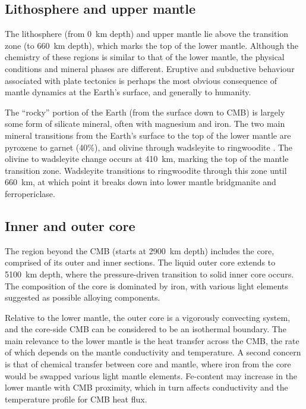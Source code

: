 \subsection{Lithosphere and upper mantle}

The lithosphere (from 0~km depth) and upper mantle lie above the transition zone (to 660~km depth), which marks the top of the lower mantle. Although the chemistry of these regions is similar to that of the lower mantle, the physical conditions and mineral phases are different. Eruptive and subductive behaviour associated with plate tectonics is perhaps the most obvious consequence of mantle dynamics at the Earth's surface, and generally to humanity.

The ``rocky'' portion of the Earth (from the surface down to CMB) is largely some form of silicate mineral, often with magnesium and iron. The two main mineral transitions from the Earth's surface to the top of the lower mantle are pyroxene to garnet (40\%), and olivine through wadsleyite to ringwoodite \citep[60\%][]{Tronnes2009}. The olivine to wadsleyite change occurs at 410~km, marking the top of the mantle transition zone. Wadsleyite transitions to ringwoodite through this zone until 660~km, at which point it breaks down into lower mantle bridgmanite and ferropericlase.

\subsection{Inner and outer core}

The region beyond the CMB (starts at 2900~km depth) includes the core, comprised of its outer and inner sections. The liquid outer core extends to 5100~km depth, where the pressure-driven transition to solid inner core occurs. The composition of the core is dominated by iron, with various light elements suggested as possible alloying components.

Relative to the lower mantle, the outer core is a vigorously convecting system, and the core-side CMB can be considered to be an isothermal boundary. The main relevance to the lower mantle is the heat transfer across the CMB, the rate of which depends on the mantle conductivity and temperature. A second concern is that of chemical transfer between core and mantle, where iron from the core would be swapped various light mantle elements. Fe-content may increase in the lower mantle with CMB proximity, which in turn affects conductivity and the temperature profile for CMB heat flux.





